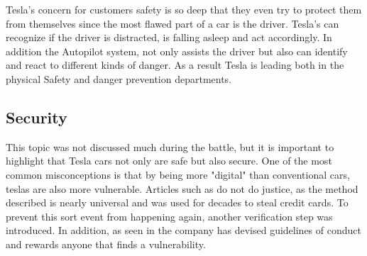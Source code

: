 \newline Tesla's concern for customers safety is so deep that they even try to protect them from themselves since the most flawed part of a car is the driver.%
\newline Tesla's can recognize if the driver is distracted, is falling asleep and act accordingly.%
In addition the Autopilot system,  not only assists the driver but also can identify and react to different kinds of danger. %
\newline As a result Tesla is leading both in the physical Safety and danger prevention departments.


\subsection{Security}
This topic was not discussed much during the battle, but it is important to highlight that Tesla cars not only are safe but also secure.%
\newline One of the most common misconceptions is that by being more "digital" than conventional cars, teslas are also more vulnerable.
Articles such as \cite{Security:Theft} do not do justice, as the method described is nearly universal and was used for decades to steal credit cards.%
To prevent this sort event from happening again, another verification step was introduced.%
\newline In addition, as seen in \cite{Security:Methods} the company has devised guidelines of conduct and rewards anyone that finds a vulnerability.
